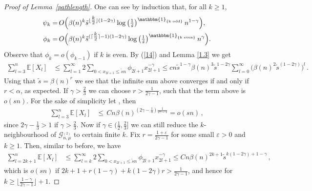 \documentclass[10pt,a4paper]{amsart}
\begin{document}
\begin{proof}[Proof of Lemma~\ref{pathlength}]
One can see by induction that, for all $k\ge1$,
\begin{equation}
\begin{aligned} \label{15}
   \psi_k =&\,O\Big(\beta(n)^{k}\tilde s ^{\lfloor \tfrac{k}{2}\rfloor(1-2\gamma)} \log\left(\tfrac{1}{\tilde s}\right)^{\mathbbm{1}_{\{\text{k odd}\}}} n^{1-\gamma} \Big), \\
    \phi_k =&\,O\Big(\beta(n)^{k}\tilde s ^{( \lceil \tfrac{k}{2}\rceil -1)(1-2\gamma)} \log\left(\tfrac{1}{\tilde s}\right)^{\mathbbm{1}_{\{\text{k even}\}}} n^{\gamma}  \Big) .
\end{aligned}    
\end{equation}
Observe that $\phi_k=o(\phi_{k-1})$ if $k$ is even. 
By (\ref{14}) and Lemma \ref{1.3} we get
\begin{align*}
    \sum_{l=3}^n \mathbb{E}[X_l] &\le \sum_{l=1}^\infty 2\sum_{0<x_{2l+1}\le \tilde s n} \phi_{2l+1} x_{2l+1}^{-\gamma}
    \le c n  \tilde s^{1-\gamma}\beta(n)^3 \tilde s ^{1-2\gamma}\sum_{l=0}^\infty \big( \beta(n)^{2 }\tilde s ^{(1-2\gamma)}\big)^l\,.
\end{align*}
Using that $\tilde s = \beta(n)^r$ we see that the infinite sum above converges if and only if $r<\alpha$, as %
expected. If $\gamma>\tfrac23$ we can choose $r>\tfrac{1}{2\gamma-1}$, such that the term above is~$o(sn)$. For the sake of simplicity let , then 
\begin{align*}
     \sum_{l=3}^n \mathbb{E}[X_l] &\le  \,C n \beta(n)^{(2\gamma-\tfrac13)\tfrac{1}{2\gamma-1}} = o(sn)\,,
\end{align*}
since $2\gamma-\tfrac13>1$ if $\gamma>\tfrac23$. Now if $\gamma\in(\tfrac12,\tfrac23]$ we can still reduce the $k$-neighbourhood of $\mathcal G^{_{(2)}}_{n,\mu}$ to certain finite $k$. Fix $r=\tfrac{1+\varepsilon}{2\gamma-1}$ for some small $\varepsilon>0$ and $k\ge1$. Then, similar to before, we have 
\begin{align*}
     \sum_{l=2k+1}^n \mathbb{E}[X_l] &\le \sum_{l=k}^\infty 2\sum_{0<x_{2l+1}\le \tilde s n} \phi_{2l+1} x_{2l+1}^{-\gamma}
     \le C n  \beta(n)^{2k+1} \tilde s ^{k(1-2\gamma)+1-\gamma} \,,
\end{align*}
which is $o(sn)$ if %
    $2k+1+r(1-\gamma)+k(1-2\gamma)r>\tfrac{1}{2\gamma-1}$,
and hence for $k\ge \lfloor\frac{1-\gamma}{2\gamma-1}\rfloor +1$.%
\smallskip%


\end{proof}
\end{document}
